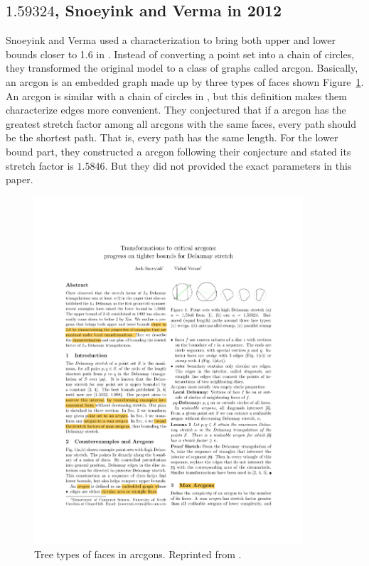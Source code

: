 \subsection{\texorpdfstring{$1.59324$}{Lg}, Snoeyink and Verma in 2012}
Snoeyink and Verma used a  characterization to bring both upper and lower bounds closer to 1.6 in \cite{arcgon}. Instead of converting a point set into a chain of circles, they transformed the original model to a class of graphs called arcgon. Basically, an arcgon is an embedded graph made up by three types of faces shown  Figure~\ref{fig:SV}. An arcgon is similar with a chain of circles in \cite{fwcg2010}, but this definition makes them characterize edges more convenient. They conjectured that if a arcgon has the greatest stretch factor among all arcgons with the same faces, every path should be the shortest path. That is, every path has the same length. For the lower bound part, they constructed a arcgon following their conjecture and stated its stretch factor  is $1.5846$. But they did not provided the exact parameters in this paper. 







\begin{figure}[ht]
\centering
\includegraphics[width=100mm]{Figures/SV.pdf}
\caption[Tree types of faces in arcgons]{Tree types of faces in arcgons. Reprinted from \cite{xia}.} 
\label{fig:SV}
\end{figure}






